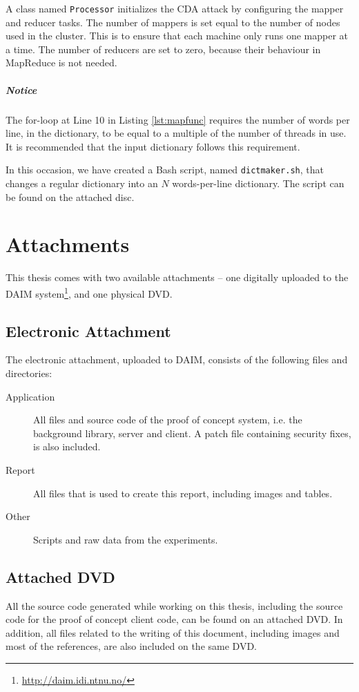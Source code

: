 \documentclass[pdftex,english,10pt,b5paper,twoside]{book}
\begin{document}
A class named \texttt{Processor} initializes the \ac{CDA} attack by configuring
the mapper and reducer tasks. The number of mappers is set equal to the number
of nodes used in the cluster. This is to ensure that each machine only runs one
mapper at a time. The number of reducers are set to zero, because their
behaviour in MapReduce is not needed.

\paragraph{Notice} The for-loop at Line 10 in Listing \ref{lst:mapfunc}
requires the number of words per line, in the dictionary, to be equal to a
multiple of the number of threads in use. It is recommended that the input
dictionary follows this requirement.

In this occasion, we have created a Bash script, named \texttt{dictmaker.sh},
that changes a regular dictionary into an $N$ words-per-line dictionary. The
script can be found on the attached disc.

\chapter{Attachments}
\label{ap:attachments}

This thesis comes with two available attachments -- one digitally uploaded to
the DAIM system\footnote{\url{http://daim.idi.ntnu.no/}}, and one physical DVD.

\section{Electronic Attachment}

The electronic attachment, uploaded to
DAIM, consists of the following files
and directories:

\begin{description}
  \item[Application] All files and source code of the proof of concept system,
    i.e. the background library, server and client. A patch file containing
    security fixes, is also included.
  \item[Report] All files that is used to create this report, including images
    and tables.
  \item[Other] Scripts and raw data from the experiments.
\end{description}

\section{Attached DVD}

All the source code generated while working on this thesis, including the
source code for the proof of concept client code, can be found on an attached
DVD. In addition, all files related to the writing of this document, including
images and most of the references, are also included on the same DVD.
\end{document}
